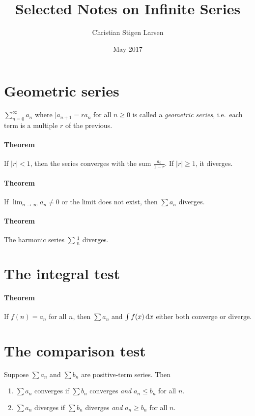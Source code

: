 \documentclass[a4paper,twocolumn,10pt]{article}
\title{Selected Notes on Infinite Series}
\author{Christian Stigen Larsen}
\date{May 2017}
\begin{document}
  \maketitle
  \section*{Geometric series}
  $\sum_{n=0}^{\infty} a_n$ where $|a_{n+1} = ra_n$ for all $n \geq 0$ is
  called a \textit{geometric series}, i.e.~each term is a multiple $r$ of the
  previous.

  \paragraph{Theorem} If $|r| < 1$, then the series converges with the sum
  $\frac{a_0}{1-r}$. If $|r| \geq 1$, it diverges.

  \paragraph{Theorem} If $\lim_{n\to\infty}{a_n}\neq 0$ or the limit does not
  exist, then $\sum a_n$ diverges.

  \paragraph{Theorem} The harmonic series $\sum \frac{1}{n}$ diverges.

  \section*{The integral test}

  \paragraph{Theorem} If $f(n) = a_n$ for all $n$, then $\sum a_n$ and $\int
  f(x) \mathop{}\!\mathrm{d} x$ either both converge or diverge.

  \section*{The comparison test}
  Suppose $\sum a_n$ and $\sum b_n$ are positive-term series. Then
  \begin{enumerate}
    \item $\sum a_n$ converges if $\sum b_n$ converges \textit{and} $a_n \leq
      b_n$ for all $n$.
    \item $\sum a_n$ diverges if $\sum b_n$ diverges \textit{and} $a_n \geq
      b_n$ for all $n$.
  \end{enumerate}
\end{document}
